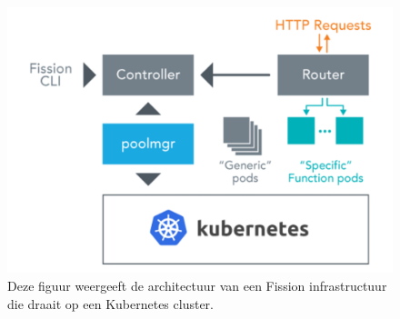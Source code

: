 \begin{figure}
    \includegraphics[width=1\textwidth]{img/fission_architectuur.png}
    \caption{Deze figuur weergeeft de architectuur van een Fission infrastructuur die draait op een Kubernetes cluster. \autocite{Chemitiganti2018}}
    \label{fig:fission-architectuur}
\end{figure}

